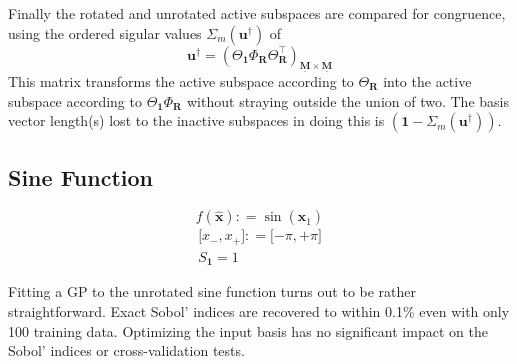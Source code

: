 \documentclass[preprint,12pt]{elsarticle}
\newcommand*{\M}[1]{\ensuremath{#1}\xspace}
\newcommand*{\vr}[1]{\M{\mathbf{#1}}}
\newcommand*{\deq}{\M{\mathrel{\mathop:}=}}
\begin{document}
        Finally the rotated and unrotated active subspaces are compared for congruence, using the ordered sigular values $\Sigma_m(\vr{u^{\dag}})$ of
        \begin{equation}
            \vr{u^{\dag}} = \left(\Theta_{\vr{1}} \Phi_{\vr{R}} \Theta_{\vr{R}}^{\intercal}\right)_{\underline{\vr{M}}\times\underline{\vr{M}}}
        \end{equation}
        This matrix transforms the active subspace according to $\Theta_{\vr{R}}$ into the active subspace according to $\Theta_{\vr{1}} \Phi_{\vr{R}}$ without straying outside the union of two. The basis vector length(s) lost to the inactive subspaces in doing this is $(\vr{1} - \Sigma_m(\vr{u^{\dag}}))$.
 

        \subsection{Sine Function} \label{sub:Results:Sin}
            \begin{equation} \label{def:Sin}
                f(\vr{\hat{x}}) \deq \sin(\vr{\hat{x}}_1)
            \end{equation}
            \begin{gather*}
                \lbrack x_-, x_+ \rbrack \deq \lbrack -\pi, +\pi \rbrack \\
                S_{\vr{1}} = 1
            \end{gather*}

            Fitting a GP to the unrotated sine function turns out to be rather straightforward. Exact Sobol' indices are recovered to within 0.1\% even with only 100 training data. Optimizing the input basis has no significant impact on the Sobol' indices or cross-validation tests.

\end{document}
